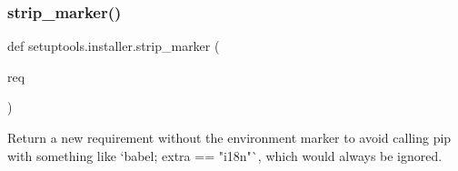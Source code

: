 \subsubsection{\texorpdfstring{strip\+\_\+marker()}{strip\_marker()}}
{\footnotesize\ttfamily def setuptools.\+installer.\+strip\+\_\+marker (\begin{DoxyParamCaption}\item[{}]{req }\end{DoxyParamCaption})}

\begin{DoxyVerb}Return a new requirement without the environment marker to avoid
calling pip with something like `babel; extra == "i18n"`, which
would always be ignored.
\end{DoxyVerb}
 